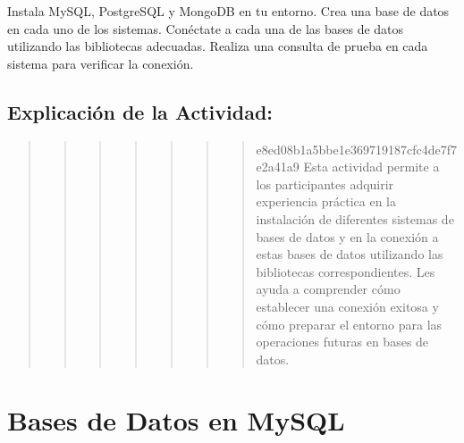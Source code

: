 \documentclass[
  a4paper,
  onepage,
  openany]{scrreprt}
\begin{document}
\begin{tcolorbox}[enhanced jigsaw, breakable, opacityback=0, toptitle=1mm, coltitle=black, toprule=.15mm, rightrule=.15mm, colframe=quarto-callout-important-color-frame, opacitybacktitle=0.6, arc=.35mm, title=\textcolor{quarto-callout-important-color}{\faExclamation}\hspace{0.5em}{Actividad Práctica:}, titlerule=0mm, colbacktitle=quarto-callout-important-color!10!white, bottomtitle=1mm, bottomrule=.15mm, colback=white, left=2mm, leftrule=.75mm]

Instala MySQL, PostgreSQL y MongoDB en tu entorno. Crea una base de
datos en cada uno de los sistemas. Conéctate a cada una de las bases de
datos utilizando las bibliotecas adecuadas. Realiza una consulta de
prueba en cada sistema para verificar la conexión.

\end{tcolorbox}

\hypertarget{explicaciuxf3n-de-la-actividad-71}{%
\section{Explicación de la
Actividad:}\label{explicaciuxf3n-de-la-actividad-71}}

\begin{quote}
\begin{quote}
\begin{quote}
\begin{quote}
\begin{quote}
\begin{quote}
\begin{quote}
e8ed08b1a5bbe1e369719187cfc4de7f7e2a41a9 Esta actividad permite a los
participantes adquirir experiencia práctica en la instalación de
diferentes sistemas de bases de datos y en la conexión a estas bases de
datos utilizando las bibliotecas correspondientes. Les ayuda a
comprender cómo establecer una conexión exitosa y cómo preparar el
entorno para las operaciones futuras en bases de datos.
\end{quote}
\end{quote}
\end{quote}
\end{quote}
\end{quote}
\end{quote}
\end{quote}

\hypertarget{bases-de-datos-en-mysql}{%
\chapter{Bases de Datos en MySQL}\label{bases-de-datos-en-mysql}}
\end{document}
